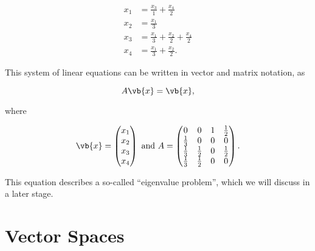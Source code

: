 \documentclass[a4paper,12pt]{report}
\begin{document}
{\begin{equation}
    \begin{aligned}
        x_{1} &= \frac{x_3}{1} + \frac{x_4}{2} \\
        x_{2} &= \frac{x_{1}}{3} \\
        x_3 &= \frac{x_{1}}{3} + \frac{x_{2}}{2} + \frac{x_4}{2} \\
        x_4 &= \frac{x_{1}}{3} + \frac{x_{2}}{2}.        
    \end{aligned}
\end{equation}

This system of linear equations can be written in vector and matrix notation, as 

\begin{equation}
    A\vb{x} = \vb{x} ,
\end{equation}

where 

\begin{equation}
    \vb{x} = \begin{pmatrix}
         x_{1} \\
         x_{2} \\
         x_3 \\
         x_4  \\
    \end{pmatrix} \text { and } A = \begin{pmatrix}
        0 & 0 & 1 &  \frac{1}{2} \\
        \frac{1}{3} & 0 & 0 & 0  \\
        \frac{1}{3}  & \frac{1}{2}  & 0 & \frac{1}{2}   \\
        \frac{1}{3}  & \frac{1}{2}  & 0 & 0  \\
    \end{pmatrix}.
\end{equation}

This equation describes a so-called ``eigenvalue problem'', which we will discuss in a later stage.}

\section{Vector Spaces} \label{vspace} 
\end{document}
